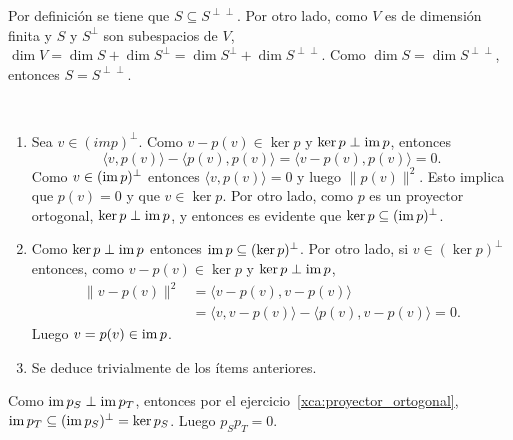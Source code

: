 \begin{solution}
	Por definición se tiene que $S\subseteq S^{\perp\perp}$. Por otro lado,
	como $V$ es de dimensión finita y $S$ y $S^\perp$ son subespacios de $V$,
	$\dim V=\dim S+\dim S^\perp=\dim S^\perp+\dim S^{\perp\perp}$. Como
	$\dim S=\dim S^{\perp\perp}$, entonces $S=S^{\perp\perp}$.
\end{solution}

\begin{solution}\
	\begin{enumerate}
		\item Sea $v\in(im p)^\perp$. Como $v-p(v)\in\ker p$ y $\ker p\perp\operatorname{im}
			p$, entonces 
			\[
			\langle v,p(v)\rangle-\langle p(v),p(v)\rangle=\langle v-p(v),p(v)\rangle=0.
			\]
			Como $v\in(\operatorname{im} p)^\perp$ entonces $\langle v,p(v)\rangle=0$ y luego
			$\|p(v)\|^2$. Esto implica que $p(v)=0$ y que $v\in\ker p$. Por
			otro lado, como $p$ es un proyector ortogonal, $\ker p\perp\operatorname{im} p$,
			y entonces es evidente que $\ker p\subseteq(\operatorname{im} p)^\perp$. 
		\item Como $\ker p\perp\operatorname{im} p$ entonces $\operatorname{im} p\subseteq(\ker p)^\perp$.
			Por otro lado, si $v\in(\ker p)^\perp$ entonces, como
			$v-p(v)\in\ker p$ y $\ker p\perp\operatorname{im} p$, 
			\begin{align*}
				\|v-p(v)\|^2&=\langle v-p(v),v-p(v)\rangle\\
				&=\langle v,v-p(v)\rangle-\langle p(v),v-p(v)\rangle=0.
			\end{align*}
			Luego $v=p(v)\in\operatorname{im} p$. 
		\item Se deduce trivialmente de los ítems anteriores.
	\end{enumerate}
\end{solution}

\begin{solution}
	Como $\operatorname{im} p_S\perp\operatorname{im} p_T$, entonces 
	por el ejercicio~\ref{xca:proyector_ortogonal}, 
	$\operatorname{im} p_T\subseteq (\operatorname{im} p_S)^\perp=\ker
	p_S$. Luego $p_Sp_T=0$. 
\end{solution}
